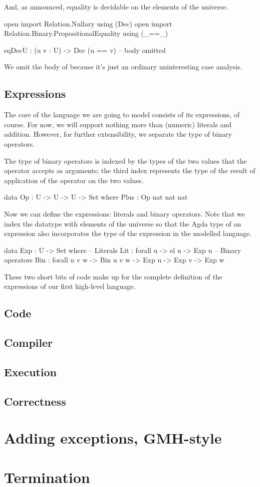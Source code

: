 \noindent And, as announced, equality is decidable on the elements of the
universe.

\begin{code}
  open import Relation.Nullary using (Dec)
  open import Relation.Binary.PropositionalEquality using (_==_)

  eqDecU : (u v : U) -> Dec (u == v)
  -- body omitted
\end{code}

\noindent We omit the body of  because it's just an ordinary
uninteresting case analysis.

\subsection{Expressions}

The core of the language we are going to model consists of its expressions, of
course. For now, we will support nothing more than (numeric) literals and addition.
However, for further extensibility, we separate the type of binary operators.

The type of binary operators is indexed by the types of the two values that
the operator accepts as arguments; the third index represents the type of
the result of application of the operator on the two values.

\begin{code}
  data Op : U -> U -> U -> Set where
    Plus : Op nat nat nat
\end{code}

\noindent Now we can define the expressions: literals and binary operators.
Note that we index the datatype with elements of the universe  so that
the Agda type of an expression also incorporates the type of the expression in
the modelled language.

\begin{code}
  data Exp : U -> Set where
    -- Literals
    Lit : forall {u} -> el u -> Exp u
    -- Binary operators
    Bin : forall {u v w} -> Bin u v w -> Exp u -> Exp v -> Exp w
\end{code}

These two short bits of code make up for the complete definition of the expressions
of our first high-level language.

\subsection{Code}

\subsection{Compiler}

\subsection{Execution}

\subsection{Correctness}

\section{Adding exceptions, GMH-style}

\section{Termination}
